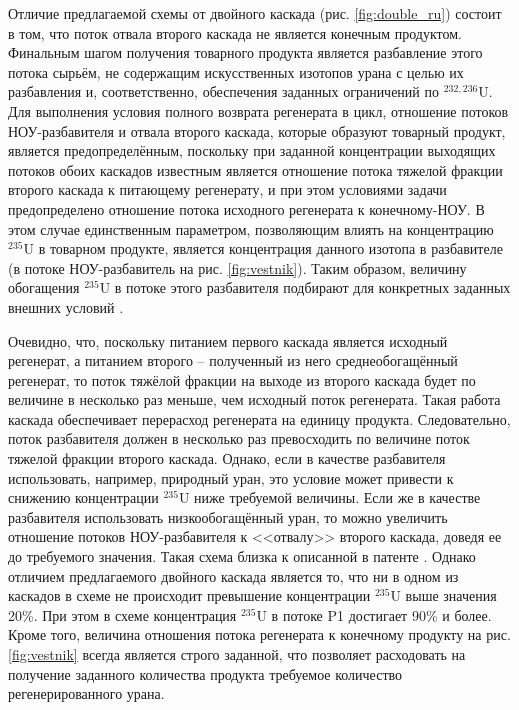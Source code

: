 Отличие предлагаемой схемы от двойного каскада (рис. \ref{fig:double_ru}) состоит в том, что поток отвала второго каскада не является конечным продуктом.
Финальным шагом получения товарного продукта является разбавление этого потока сырьём, не содержащим искусственных изотопов урана с целью их разбавления и, соответственно, обеспечения заданных ограничений по $^{232,236}$U.
Для выполнения условия полного возврата регенерата в цикл, отношение потоков НОУ-разбавителя и отвала второго каскада, которые образуют товарный продукт, является предопределённым, поскольку при заданной концентрации выходящих потоков обоих каскадов известным является отношение потока тяжелой фракции второго каскада к питающему регенерату, и при этом условиями задачи предопределено отношение потока исходного регенерата к конечному-НОУ.
В этом случае единственным параметром, позволяющим влиять на концентрацию $^{235}$U в товарном продукте, является концентрация данного изотопа в разбавителе (в потоке НОУ-разбавитель на рис. \ref{fig:vestnik}).
Таким образом, величину обогащения $^{235}$U в потоке этого разбавителя подбирают для конкретных заданных внешних условий \cite{smirnovObogashchenieRegenerirovannogoUrana2018}.

Очевидно, что, поскольку питанием первого каскада является исходный регенерат, а питанием второго -- полученный из него среднеобогащённый регенерат, то поток тяжёлой фракции на выходе из второго каскада будет по величине в несколько раз меньше, чем исходный поток регенерата. Такая работа каскада обеспечивает перерасход регенерата на единицу продукта. Следовательно, поток разбавителя должен в несколько раз превосходить по величине поток тяжелой фракции второго каскада. Однако, если в качестве разбавителя использовать, например, природный уран, это условие может привести к снижению концентрации $^{235}$U ниже требуемой величины. Если же в качестве разбавителя использовать низкообогащённый уран, то можно увеличить отношение потоков НОУ-разбавителя к <<отвалу>> второго каскада, доведя ее до требуемого значения.  
Такая схема близка к описанной в патенте \cite{zhurinSposobIzotopnogoVosstanovleniya2010}. Однако отличием предлагаемого двойного каскада является то, что ни в одном из каскадов в схеме не происходит превышение концентрации $^{235}$U выше значения 20\%. При этом в схеме  \cite{zhurinSposobIzotopnogoVosstanovleniya2010} концентрация $^{235}$U в потоке P1 достигает 90\% и более. Кроме того, величина отношения потока регенерата к конечному продукту на рис. \ref{fig:vestnik} всегда является строго заданной, что позволяет расходовать на получение заданного количества продукта требуемое количество регенерированного урана.


